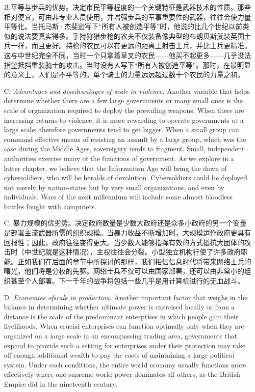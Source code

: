 \begin{Parallel}{97mm}{45mm}
  \ParallelRText
  {B.平等与步兵的优势。决定市民平等程度的一个关键特征是武器技术的性质。那些相对便宜，可由非专业人员使用，并增强步兵的军事重要性的武器，往往会使力量平等化。当托马斯·杰斐逊写下“所有人被创造平等”时，他说的比几个世纪以前类似的说法要真实得多。手持狩猎步枪的农夫不仅装备像典型的布朗贝斯武装英国士兵一样，而且更好。持枪的农民可以在更远的距离上射击士兵，并比士兵更精准。这与中世纪完全不同，当时一个只拿着草叉的农民——他买不起更多——几乎没法指望抵挡重装骑士的攻击。当时没有人写下“所有人被创造平等”。那时，在最明显的意义上，人们是不平等的。单个骑士的力量远远超过数十个农民的力量之和。}
  \ParallelPar


  \ParallelLText
  {C. \emph{Advantages and disadvantages of scale in violence.} Another variable that helps determine whether there are a few large governments or many small ones is the scale of organization required to deploy the prevailing weapons. When there are increasing returns to violence, it is more rewarding to operate governments at a large scale; therefore governments tend to get bigger. When a small group can command effective means of resisting an assault by a large group, which was the case during the Middle Ages, sovereignty tends to fragment. Small, independent authorities exercise many of the functions of government. As we explore in a latter chapter, we believe that the Information Age will bring the dawn of cybersoldiers, who will be heralds of devolution. Cybersoldiers could be deployed not merely by nation-states but by very small organizations, and even by individuals. Wars of the next millennium will include some almost bloodless battles fought with computers.    }
  
  \ParallelRText
  {C. 暴力规模的优劣势。决定政府数量是少数大政府还是众多小政府的另一个变量是部署主流武器所需的组织规模。当暴力收益不断增加时，大规模运作政府更具有回报性；因此，政府往往变得更大。当少数人能够指挥有效的方式抵抗大团体的攻击时（中世纪就是这种情况），主权往往会分裂。小型独立机构行使了许多政府职能。正如我们在后面的章节中所探讨的那样，我们相信信息时代将带来网络士兵的曙光，他们将是分权的先驱。网络士兵不仅可以由国家部署，还可以由非常小的组织甚至个人部署。下一千年的战争将包括一些几乎是用计算机进行的无血战斗。}
  \ParallelPar



  \ParallelLText
  {D. \emph{Economies ofscale in production.} Another important factor that weighs in the balance in determining whether ultimate power is exercised locally or from a distance is the scale of the predominant enterprises in which people gain their livelihoods. When crucial enterprises can function optimally only when they are organized on a large scale in an encompassing trading area, governments that expand to provide such a setting for enterprises under their protection may rake off enough additional wealth to pay the costs of maintaining a large political system. Under such conditions, the entire world economy usually functions more effectively where one supreme world power dominates all others, as the British Empire did in the nineteenth century. }
  

\end{Parallel}
